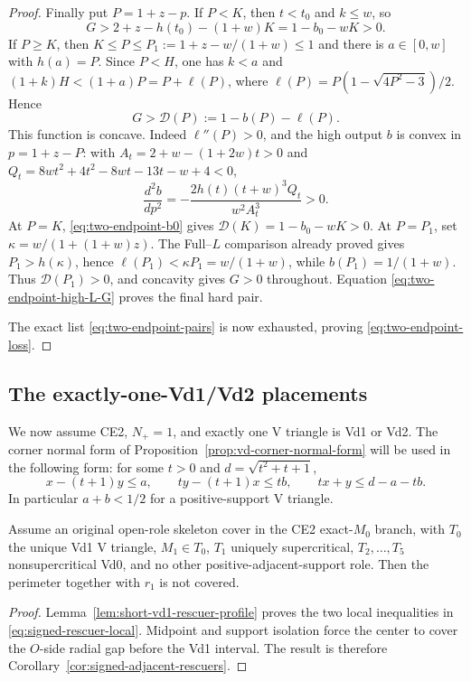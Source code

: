 \begin{proof}
Finally put $P=1+z-p$.  If $P<K$, then $t<t_0$ and $k\le w$, so
\[
 G>2+z-h(t_0)-(1+w)K=1-b_0-wK>0.
\]
If $P\ge K$, then $K\le P\le P_1:=1+z-w/(1+w)\le1$ and there is
$a\in[0,w]$ with $h(a)=P$.  Since $P<H$, one has $k<a$ and
$(1+k)H<(1+a)P=P+\ell(P)$, where
$\ell(P)=P(1-\sqrt{4P^2-3})/2$.  Hence
\[
 G>\mathcal D(P):=1-b(P)-\ell(P).
\]
This function is concave.  Indeed $\ell''(P)>0$, and the high output $b$ is
convex in $p=1+z-P$: with
$A_t=2+w-(1+2w)t>0$ and
$Q_t=8wt^2+4t^2-8wt-13t-w+4<0$,
\[
 \frac{d^2b}{dp^2}=-\frac{2h(t)(t+w)^3Q_t}{w^2A_t^3}>0.
\]
At $P=K$, \eqref{eq:two-endpoint-b0} gives
$\mathcal D(K)=1-b_0-wK>0$.  At $P=P_1$, set
$\kappa=w/(1+(1+w)z)$.  The Full--$L$ comparison already proved gives
$P_1>h(\kappa)$, hence
$\ell(P_1)<\kappa P_1=w/(1+w)$, while $b(P_1)=1/(1+w)$.
Thus $\mathcal D(P_1)>0$, and concavity gives $G>0$ throughout.
Equation \eqref{eq:two-endpoint-high-L-G} proves the final hard pair.

The exact list \eqref{eq:two-endpoint-pairs} is now exhausted, proving
\eqref{eq:two-endpoint-loss}.
\end{proof}

\subsection{The exactly-one-Vd1/Vd2 placements}

We now assume CE2, $N_+=1$, and exactly one V triangle is Vd1 or Vd2.  The corner
normal form of Proposition~\ref{prop:vd-corner-normal-form} will be used in
the following form: for some $t>0$ and $d=\sqrt{t^2+t+1}$,
\begin{equation}
 x-(t+1)y\le a,\qquad ty-(t+1)x\le tb,\qquad
 tx+y\le d-a-tb.
 \label{eq:vd-corner-form}
\end{equation}
In particular $a+b<1/2$ for a positive-support V triangle.

\begin{lemma}
\label{lem:vd1-adjacent-rescue}
Assume an original open-role skeleton cover in the CE2 exact-$M_0$ branch,
with $T_0$ the unique Vd1 V triangle, $M_1\in T_0$, $T_1$ uniquely supercritical,
$T_2,\ldots,T_5$ nonsupercritical Vd0, and no other positive-adjacent-support
role.  Then the perimeter together with $r_1$ is not covered.
\end{lemma}

\begin{proof}
Lemma~\ref{lem:short-vd1-rescuer-profile} proves the two local inequalities
in \eqref{eq:signed-rescuer-local}.  Midpoint and support isolation force the
center to cover the $O$-side radial gap before the Vd1 interval.  The result is
therefore Corollary~\ref{cor:signed-adjacent-rescuers}.
\end{proof}

